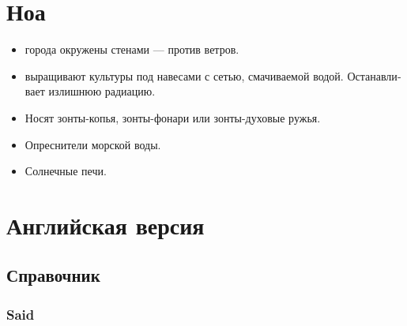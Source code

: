 \documentclass[a4paper,12pt,fleqn]{book}\usepackage{polyglossia}\setdefaultlanguage[babelshorthands=true]{russian}\setotherlanguage{english}\defaultfontfeatures{Ligatures=TeX,Mapping=tex-text}\usepackage{xcolor}\newcommand{\ml}[3]{#2}
\begin{document}
{\section{Ноа}

\begin{itemize}
\item города окружены стенами --- против ветров.
\item выращивают культуры под навесами с сетью, смачиваемой водой.
Останавливает излишнюю радиацию.
\item Носят зонты-копья, зонты-фонари или зонты-духовые ружья.
\item Опреснители морской воды.
\item Солнечные печи.
\end{itemize}

\section{Английская версия}

\subsection{Справочник}

\subsubsection{Said}

}
\end{document}
